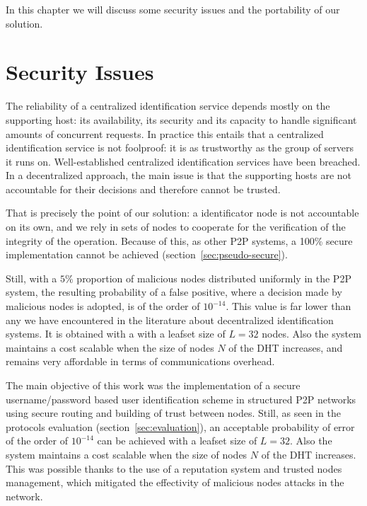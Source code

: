 In this chapter we will discuss some security issues and the portability of our
solution.%

\section{Security Issues}
The reliability of a centralized identification service depends mostly on the
supporting host: its availability, its security and its capacity  to handle
significant amounts of concurrent requests. In practice this entails that a
centralized identification service is not foolproof: it is as trustworthy as
the group of servers it runs on. Well-established centralized identification
services have been breached. %
In a decentralized approach, the main issue is that the supporting hosts are
not accountable for their decisions and therefore cannot be trusted. 

That is precisely the point of our solution: a identificator node is not
accountable on
its own, and we rely in sets of nodes to cooperate for the verification of the
integrity of the operation.
 Because of this, as other P2P systems, a 100\% secure implementation cannot be achieved
(section~\ref{sec:pseudo-secure}).

Still, with a $5\%$ proportion of
malicious nodes distributed uniformly in the P2P system, the resulting probability of a false
positive, where a decision made by malicious nodes is adopted, is of the order
of $10^{-14}$. This value is far lower than any we have encountered in the
literature about decentralized identification systems. It is obtained with a
with a leafset size of $L = 32$ nodes.
Also the system maintains a cost scalable when the size of nodes $N$ of the DHT
increases, and remains very affordable in terms of communications overhead. 

The main objective of this work was the implementation of a secure username/password based user identification scheme in structured P2P
networks using secure routing and building of trust between nodes. Still, as seen in the
protocols evaluation (section~\ref{sec:evaluation}), an acceptable probability of error of the order
of $10^{-14}$ can be achieved with a leafset size of $L = 32$. Also the system
maintains a cost scalable when the size of nodes $N$ of the DHT increases.
This was possible thanks to the use of a reputation system and trusted
nodes management, which mitigated the effectivity of malicious nodes attacks in
the network.


